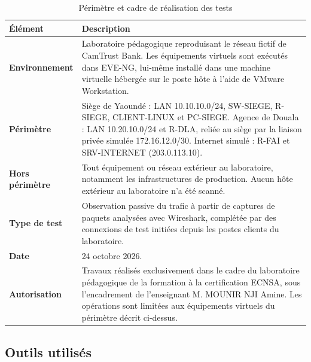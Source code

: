 \documentclass[11pt,a4paper]{article}
\begin{document}
	\begin{table}[H]
		\centering
		\begin{tabularx}{\linewidth}{>{\bfseries}p{3.6cm}Y}
			\toprule
			Élément & Description \\
			\midrule
			
			Environnement &
			Laboratoire pédagogique reproduisant le réseau fictif de
			CamTrust Bank. Les équipements virtuels sont exécutés dans
			EVE-NG, lui-même installé dans une machine virtuelle hébergée
			sur le poste hôte à l'aide de VMware Workstation. \\
			
			Périmètre &
			Siège de Yaoundé : LAN 10.10.10.0/24, SW-SIEGE, R-SIEGE,
			CLIENT-LINUX et PC-SIEGE.
			Agence de Douala : LAN 10.20.10.0/24 et R-DLA, reliée au siège
			par la liaison privée simulée 172.16.12.0/30.
			Internet simulé : R-FAI et SRV-INTERNET (203.0.113.10). \\
			
			Hors périmètre &
			Tout équipement ou réseau extérieur au laboratoire,
			notamment les infrastructures de production.
			Aucun hôte extérieur au laboratoire n'a été scanné. \\
			
			Type de test &
			Observation passive du trafic à partir de captures de paquets
			analysées avec Wireshark, complétée par des connexions de test
			initiées depuis les postes clients du laboratoire. \\
			
			Date &
			24 octobre 2026. \\
			
			Autorisation &
			Travaux réalisés exclusivement dans le cadre du laboratoire
			pédagogique de la formation à la certification ECNSA,
			sous l'encadrement de l'enseignant M. MOUNIR NJI Amine.
			Les opérations sont limitées aux équipements virtuels
			du périmètre décrit ci-dessus. \\
			
			\bottomrule
		\end{tabularx}
		\caption{Périmètre et cadre de réalisation des tests}
	\end{table}
	
	\subsection*{Outils utilisés}
	
\end{document}
